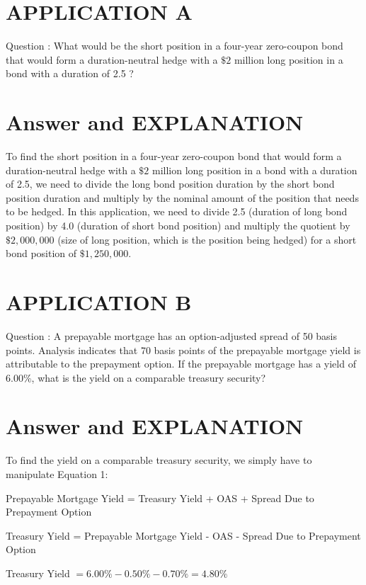 \documentclass[11pt]{article}
\begin{document}
\section*{APPLICATION A}
Question : What would be the short position in a four-year zero-coupon bond that would form a duration-neutral hedge with a $\$ 2$ million long position in a bond with a duration of 2.5 ?

\section*{ Answer and EXPLANATION}
To find the short position in a four-year zero-coupon bond that would form a duration-neutral hedge with a $\$ 2$ million long position in a bond with a duration of 2.5, we need to divide the long bond position duration by the short bond position duration and multiply by the nominal amount of the position that needs to be hedged. In this application, we need to divide 2.5 (duration of long bond position) by 4.0 (duration of short bond position) and multiply the quotient by $\$ 2,000,000$ (size of long position, which is the position being hedged) for a short bond position of $\$ 1,250,000$.

\section*{APPLICATION B}
Question : A prepayable mortgage has an option-adjusted spread of 50 basis points. Analysis indicates that 70 basis points of the prepayable mortgage yield is attributable to the prepayment option. If the prepayable mortgage has a yield of $6.00 \%$, what is the yield on a comparable treasury security?

\section*{ Answer and EXPLANATION}
To find the yield on a comparable treasury security, we simply have to manipulate Equation 1:

Prepayable Mortgage Yield = Treasury Yield + OAS + Spread Due to Prepayment Option

Treasury Yield = Prepayable Mortgage Yield - OAS - Spread Due to Prepayment Option

Treasury Yield $=6.00 \%-0.50 \%-0.70 \%=4.80 \%$
\end{document}

